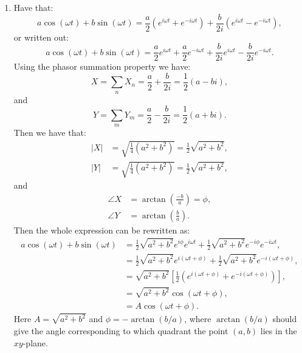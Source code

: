 \begin{enumerate}
  \item Have that:
        \[ a\cos(\omega t)+b\sin(\omega t)=\frac{a}{2}(e^{i\omega t}+e^{-i\omega t})+\frac{b}{2i}(e^{i\omega t}-e^{-i\omega t}), \]
        or written out:
        \[ a\cos(\omega t)+b\sin(\omega t)=\frac{a}{2}e^{i\omega t}+\frac{a}{2}e^{-i\omega t}+\frac{b}{2i}e^{i\omega t}-\frac{b}{2i}e^{-i\omega t}. \]
        Using the phasor summation property we have:
        \[ X = \sum_{n}X_{n} = \frac{a}{2}+\frac{b}{2i}=\frac{1}{2}(a-bi), \]
        and
        \[ Y = \sum_{m}Y_{m} = \frac{a}{2}-\frac{b}{2i}=\frac{1}{2}(a+bi). \]
        Then we have that:
        \begin{align*}
          |X| & =\sqrt{\frac{1}{4}(a^{2}+b^{2})}=\frac{1}{2}\sqrt{a^{2}+b^{2}}, \\
          |Y| & =\sqrt{\frac{1}{4}(a^{2}+b^{2})}=\frac{1}{2}\sqrt{a^{2}+b^{2}},
        \end{align*}
        and
        \begin{align*}
          \angle X & =\arctan\left(\frac{-b}{a}\right)=\phi, \\
          \angle Y & =\arctan\left(\frac{b}{a}\right).
        \end{align*}
        Then the whole expression can be rewritten as:
        \begin{align*}
          a\cos(\omega t)+b\sin(\omega t) & =\frac{1}{2}\sqrt{a^{2}+b^{2}}e^{i\phi}e^{i\omega t}+\frac{1}{2}\sqrt{a^{2}+b^{2}}e^{-i\phi}e^{-i\omega t}, \\
                                          & =\frac{1}{2}\sqrt{a^{2}+b^{2}}e^{i(\omega t+\phi)}+\frac{1}{2}\sqrt{a^{2}+b^{2}}e^{-i(\omega t+\phi)},      \\
                                          & =\sqrt{a^{2}+b^{2}}\left[\frac{1}{2}\left(e^{i(\omega t+\phi)}+e^{-i(\omega t+\phi)}\right)\right],         \\
                                          & =\sqrt{a^{2}+b^{2}}\cos(\omega t+\phi),                                                                     \\
                                          & =A\cos(\omega t+\phi).
        \end{align*}
        Here $A=\sqrt{a^{2}+b^{2}}$ and $\phi=-\arctan(b/a)$, where $\arctan(b/a)$
        should give the angle corresponding to which quadrant the point $(a,b)$ lies in the $xy$-plane.


\end{enumerate}

